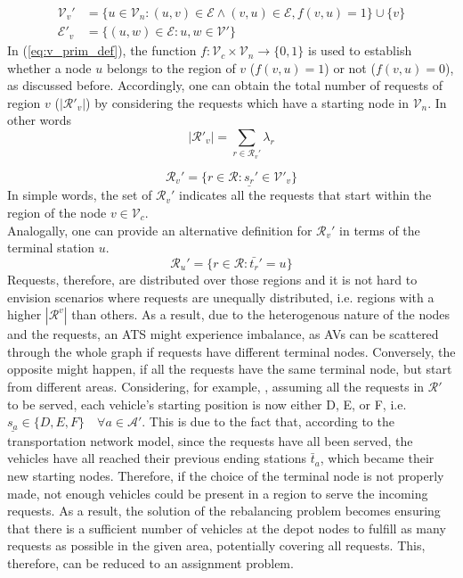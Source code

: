 \begin{align}
\mathcal{V}_v' &= \{ u \in \mathcal{V}_n : (u, v) \in \mathcal{E} \wedge (v, u) \in \mathcal{E} , f(v,u) = 1 \} \cup \{ v\} \label{eq:v_prim_def}\\
\mathcal{E}'_v &= \{ (u, w) \in \mathcal{E} : u, w \in \mathcal{V}' \} 
\end{align}
In (\ref{eq:v_prim_def}), the function $f :  \mathcal{V}_c \times \mathcal{V}_n \rightarrow \{0,1\}$ is used to establish whether a node $u$ belongs to the region of $v$ ($f(v,u) = 1$) or not ($f(v,u) = 0$), as discussed before. Accordingly, one can obtain the total number of requests of region $v$ ($|\mathcal{R}'_v|$) by considering the requests which have a starting node in $\mathcal{V}_n$. In other words
\begin{equation}
|\mathcal{R}'_v| = \sum_{r \in \mathcal{R}_v'} \lambda_r
\end{equation}

\begin{equation}
\mathcal{R}_v'= \{ r \in \mathcal{R} : \underline{s_r}' \in \mathcal{V'}_v \} \label{eq:req_per_reg}
\end{equation}
In simple words, the set of $\mathcal{R}_v'$ indicates all the requests that start within the region of the node $v \in \mathcal{V}_c$. \\
Analogally, one can provide an alternative definition for $\mathcal{R}_v'$ in terms of the terminal station $u$.
\begin{equation}
	\mathcal{R}_u'= \{ r \in \mathcal{R} : \bar{t_r}' = u \}%
\end{equation}
Requests, therefore, are distributed over those regions and it is not hard to envision scenarios where requests are unequally distributed, i.e. regions with a higher $|\mathcal{R}^v| $ than others. As a result, due to the heterogenous nature of the nodes and the requests, an ATS might experience imbalance, as AVs can be scattered through the whole graph if requests have different terminal nodes. Conversely, the opposite might happen, if all the requests have the same terminal node, but start from different areas. Considering, for example, , assuming all the requests in $\mathcal{R}'$ to be served, each vehicle's starting position is now either D, E, or F, i.e. $\underline{s_a} \in \{D, E, F\} \quad \forall a \in \mathcal{A}'$. This is due to the fact that, according to the transportation network model, since the requests have all been served, the vehicles have all reached their previous ending stations $\bar{t}_a$, which became their new starting nodes. Therefore, if the choice of the terminal node is not properly made, not enough vehicles could be present in a region to serve the incoming requests. As a result, the solution of the rebalancing problem becomes ensuring that there is a sufficient number of vehicles at the depot nodes to fulfill as many requests as possible in the given area, potentially covering all requests. This, therefore, can be reduced to an assignment problem.

